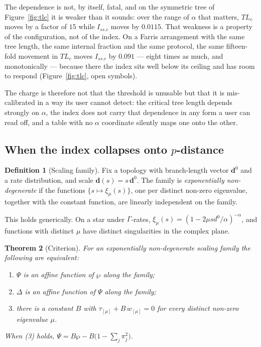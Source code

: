 \documentclass[11pt]{article}
\newcommand{\Issc}{I_{ss.c}}
\newtheorem{theorem}{Theorem}
\theoremstyle{definition}
\newtheorem{definition}[theorem]{Definition}
\theoremstyle{remark}
\begin{document}
The dependence is not, by itself, fatal, and on the symmetric tree of
Figure~\ref{fig:tlc} it is weaker than it sounds: over the range of $\alpha$
that matters, $TL_c$ moves by a factor of $15$ while $\Issc$ moves by
$0.0115$. That weakness is a property of the configuration, not of the
index. On a Farris arrangement with the same tree length, the same internal
fraction and the same protocol, the same fifteen-fold movement in $TL_c$
moves $\Issc$ by $0.091$ --- eight times as much, and monotonically ---
because there the index sits well below its ceiling and has room to respond
(Figure~\ref{fig:tlc}, open symbols).

The charge is therefore not that the threshold is unusable but that it is
mis-calibrated in a way its user cannot detect: the critical tree length
depends strongly on $\alpha$, the index does not carry that dependence in any
form a user can read off, and a table with no $\alpha$ coordinate silently
maps one onto the other.

\subsection{When the index collapses onto \texorpdfstring{$p$}{p}-distance}
\label{sec:criterion}

\begin{definition}[Scaling family]
Fix a topology with branch-length vector $\mathbf d^0$ and a rate
distribution, and scale $\mathbf d(s)=s\,\mathbf d^0$. The family is
\emph{exponentially non-degenerate} if the functions
$\{s\mapsto\xi_\mu(s)\}$, one per distinct non-zero eigenvalue, together with
the constant function, are linearly independent on the family.
\end{definition}

This holds generically. On a star under $\Gamma$-rates,
$\xi_\mu(s)=(1-2\mu s d^0/\alpha)^{-\alpha}$, and functions with distinct
$\mu$ have distinct singularities in the complex plane.

\begin{theorem}[Criterion]
\label{thm:affine}
For an exponentially non-degenerate scaling family the following are
equivalent:
\begin{enumerate}
\item $\Psi$ is an affine function of $\wp$ along the family;
\item $\Delta$ is an affine function of $\Psi$ along the family;
\item there is a constant $B$ with $\tau_{[\mu]}+B\,w_{[\mu]}=0$ for every
      distinct non-zero eigenvalue $\mu$.
\end{enumerate}
When (3) holds, $\Psi=B\wp-B\bigl(1-\sum_j\pi_j^2\bigr)$.
\end{theorem}
\end{document}
